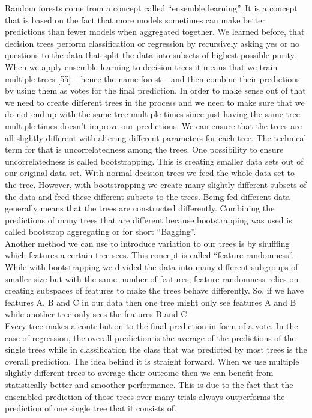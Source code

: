 \documentclass[a4paper,12pt]{report}
\begin{document}
	Random forests come from a concept called “ensemble learning”. It is a concept that is based on the fact that more models sometimes can make better predictions than fewer models when aggregated together. We learned before, that decision trees perform classification or regression by recursively asking yes or no questions to the data that split the data into subsets of highest possible purity.
When we apply ensemble learning to decision trees it means that we train multiple trees [55] – hence the name forest – and then combine their predictions by using them as votes for the final prediction. In order to make sense out of that we need to create different trees in the process and we need to make sure that we do not end up with the same tree multiple times since just having the same tree multiple times doesn’t improve our predictions. We can ensure that the trees are all slightly different with altering different parameters for each tree. The technical term for that is uncorrelatedness among the trees. One possibility to ensure uncorrelatedness is called bootstrapping. This is creating smaller data sets out of our original data set. With normal decision trees we feed the whole data set to the tree. However, with bootstrapping we create many slightly different subsets of the data and feed these different subsets to the trees. Being fed different data generally means that the trees are constructed differently. Combining the predictions of many trees that are different because bootstrapping was used is called bootstrap aggregating or for short “Bagging”.\\
Another method we can use to introduce variation to our trees is by shuffling which features a certain tree sees. This concept is called “feature randomness”. While with bootstrapping we divided the data into many different subgroups of smaller size but with the same number of features, feature randomness relies on creating subspaces of features to make the trees behave differently. So, if we have features A, B and C in our data then one tree might only see features A and B while another tree only sees the features B and C.\\
Every tree makes a contribution to the final prediction in form of a vote. In the case of regression, the overall prediction is the average of the predictions of the single trees while in classification the class that was predicted by most trees is the overall prediction. The idea behind it is straight forward. When we use multiple slightly different trees to average their outcome then we can benefit from statistically better and smoother performance. This is due to the fact that the ensembled prediction of those trees over many trials always outperforms the prediction of one single tree that it consists of.
\end{document}
